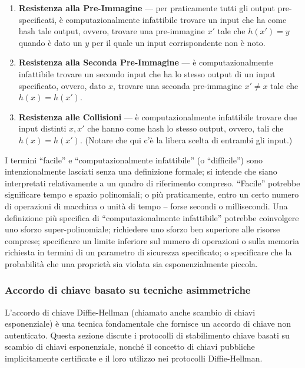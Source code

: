 \documentclass{article}
\theoremstyle{definition}
\begin{document}
\begin{enumerate}
    \item \textbf{Resistenza alla Pre-Immagine} --- per praticamente tutti gli output pre-specificati, è computazionalmente infattibile trovare un input che ha come hash tale output, ovvero, trovare una pre-immagine \( x' \) tale che \( h(x') = y \) quando è dato un \( y \) per il quale un input corrispondente non è noto.
    \item \textbf{Resistenza alla Seconda Pre-Immagine} --- è computazionalmente infattibile trovare un secondo input che ha lo stesso output di un input specificato, ovvero, dato \( x \), trovare una seconda pre-immagine \( x' \neq x \) tale che \( h(x) = h(x') \).
    \item \textbf{Resistenza alle Collisioni} --- è computazionalmente infattibile trovare due input distinti \( x, x' \) che hanno come hash lo stesso output, ovvero, tali che \( h(x) = h(x') \). (Notare che qui c'è la libera scelta di entrambi gli input.)
\end{enumerate}

I termini ``facile'' e ``computazionalmente infattibile'' (o ``difficile'') sono intenzionalmente lasciati senza una definizione formale; si intende che siano interpretati relativamente a un quadro di riferimento compreso. ``Facile'' potrebbe significare tempo e spazio polinomiali; o più praticamente, entro un certo numero di operazioni di macchina o unità di tempo – forse secondi o millisecondi. Una definizione più specifica di ``computazionalmente infattibile'' potrebbe coinvolgere uno sforzo super-polinomiale; richiedere uno sforzo ben superiore alle risorse comprese; specificare un limite inferiore sul numero di operazioni o sulla memoria richiesta in termini di un parametro di sicurezza specificato; o specificare che la probabilità che una proprietà sia violata sia esponenzialmente piccola.

\subsubsection{Accordo di chiave basato su tecniche asimmetriche}%

L'accordo di chiave Diffie-Hellman (chiamato anche scambio di chiavi esponenziale) è una tecnica fondamentale che fornisce un accordo di chiave non autenticato. Questa sezione discute i protocolli di stabilimento chiave basati su scambio di chiavi esponenziale, nonché il concetto di chiavi pubbliche implicitamente certificate e il loro utilizzo nei protocolli Diffie-Hellman.
\end{document}
